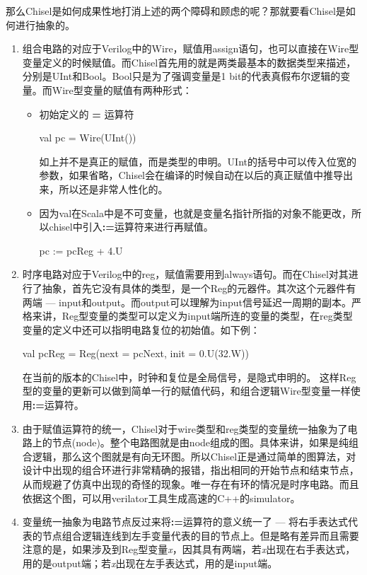 那么Chisel是如何成果性地打消上述的两个障碍和顾虑的呢？那就要看Chisel是如何进行抽象的。
\begin{enumerate}[label=(\alph*)]
	\item 组合电路的对应于Verilog中的Wire，赋值用assign语句，也可以直接在Wire型变量定义的时候赋值。而Chisel首先用的就是两类最基本的数据类型来描述，分别是UInt和Bool。Bool只是为了强调变量是1 bit的代表真假布尔逻辑的变量。而Wire型变量的赋值有两种形式：
	\begin{itemize}
		\item 初始定义的 \textbf{=} 运算符 
		\begin{scala} 
			val pc = Wire(UInt())
		\end{scala}
		
		如上并不是真正的赋值，而是类型的申明。UInt的括号中可以传入位宽的参数，如果省略，Chisel会在编译的时候自动在以后的真正赋值中推导出来，所以还是非常人性化的。
		\item 因为val在Scala中是不可变量，也就是变量名指针所指的对象不能更改，所以chisel中引入\textbf{:=}运算符来进行再赋值。
		\begin{scala} 
			pc := pcReg + 4.U 
		\end{scala}		
	\end{itemize}
	\item 时序电路对应于Verilog中的reg，赋值需要用到always语句。而在Chisel对其进行了抽象，首先它没有具体的类型，是一个Reg的元器件。其次这个元器件有两端 --- input和output。而output可以理解为input信号延迟一周期的副本。严格来讲，Reg型变量的类型可以定义为input端所连的变量的类型，在reg类型变量的定义中还可以指明电路复位的初始值。如下例：
	\begin{scala}
		val pcReg = Reg(next = pcNext, init = 0.U(32.W))
	\end{scala}
	在当前的版本的Chisel中，时钟和复位是全局信号，是隐式申明的\citep{chisel2017}。
	这样Reg型的变量的更新可以做到简单一行的赋值代码，和组合逻辑Wire型变量一样使用\textbf{:=}运算符。
	\item 由于赋值运算符的统一，Chisel对于wire类型和reg类型的变量统一抽象为了电路上的节点(node)。整个电路图就是由node组成的图。具体来讲，如果是纯组合逻辑，那么这个图就是有向无环图。所以Chisel正是通过简单的图算法，对设计中出现的组合环进行非常精确的报错，指出相同的开始节点和结束节点，从而规避了仿真中出现的奇怪的现象。唯一存在有环的情况是时序电路。而且依据这个图，可以用verilator工具生成高速的C++的simulator\citep{chisel2017}。
	\item 变量统一抽象为电路节点反过来将\textbf{:=}运算符的意义统一了 --- 将右手表达式代表的节点组合逻辑连线到左手变量代表的目的节点上。但是略有差异而且需要注意的是，如果涉及到Reg型变量\textit{x}，因其具有两端，若\textit{x}出现在右手表达式，用的是output端；若\textit{x}出现在左手表达式，用的是input端\citep{chisel2017}。
	

\end{enumerate}

